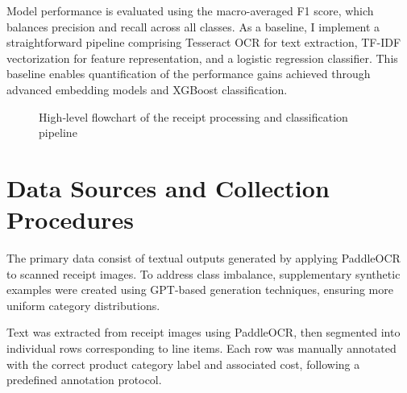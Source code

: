 \documentclass{SGGW-thesis-EN}
\begin{document}
Model performance is evaluated using the macro-averaged F1 score, which balances precision and recall across all classes. 
As a baseline, I implement a straightforward pipeline comprising Tesseract OCR for text extraction, TF-IDF vectorization for feature representation, 
and a logistic regression classifier. 
This baseline enables quantification of the performance gains achieved through advanced embedding models and XGBoost classification.

\begin{figure}[h!]
  \centering
  \caption{High‐level flowchart of the receipt processing and classification pipeline}
  \label{fig:pipeline_flowchart_vertical}
\end{figure}


\section{Data Sources and Collection Procedures}
The primary data consist of textual outputs generated by applying PaddleOCR to scanned receipt images. 
To address class imbalance, supplementary synthetic examples were created using GPT-based generation techniques, ensuring more uniform category distributions.

Text was extracted from receipt images using PaddleOCR, then segmented into individual rows corresponding to line items. 
Each row was manually annotated with the correct product category label and associated cost, following a predefined annotation protocol.
\end{document}

